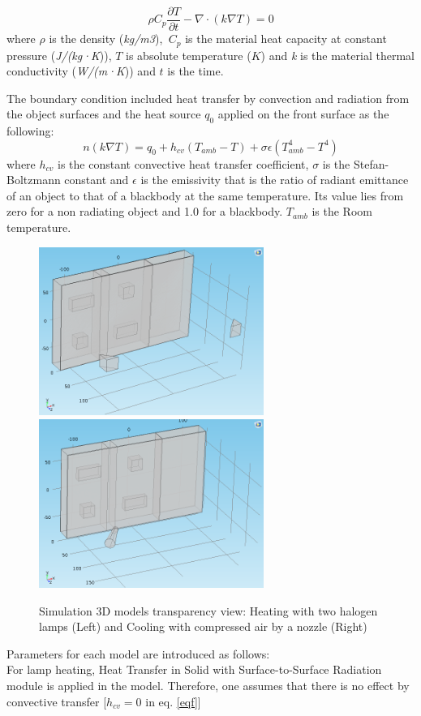 \documentclass{tQRT2e}
\begin{document}
\begin{equation}
\rho C_p \frac{\partial T}{\partial t}-\nabla \cdot (k\nabla T) = 0
\end{equation}
where $\rho$ is the density (\textit{kg/m3}),   $C_p$ is the material heat capacity at constant pressure (\textit{J/(kg·K})), $ T $ is absolute temperature ($ K $) and \textit{k} is the material thermal conductivity (\textit{W/(m·K})) and $ t $ is the time.

The boundary condition included heat transfer by convection and radiation from the object surfaces and the  heat  source $q_0 $  applied on the front surface as the following: 
\begin{equation}
n(k\nabla T) = q_0 + h_{cv}(T_{amb}-T)+\sigma \epsilon(T_{amb}^4-T^4)
\label{eqf}
\end{equation}
where $ h_{cv} $ is the constant convective heat transfer coefficient, $\sigma$ is the Stefan-Boltzmann constant  and $\epsilon$ is the emissivity that is the ratio of radiant emittance of an object to that of a blackbody at the same temperature. Its value lies from zero for a non radiating object and 1.0 for a blackbody. $ T_{amb} $ is the Room temperature.
\begin{figure}
	\includegraphics[width=7.33cm, height=5.5cm]{Flash_model2}
	\includegraphics[width=7.33cm, height=5.5cm]{Laminar_model2}
	\caption{Simulation 3D models transparency view:  Heating with two halogen lamps (Left) and Cooling with compressed air by a nozzle (Right)}
	\label{models}
\end{figure}
Parameters for each model are introduced as follows:\\
For lamp heating, Heat Transfer in Solid with Surface-to-Surface Radiation module is applied in the model. Therefore, one assumes that there is no effect by convective transfer [$h_{cv}=0$ in eq. \ref{eqf}]
\end{document}
